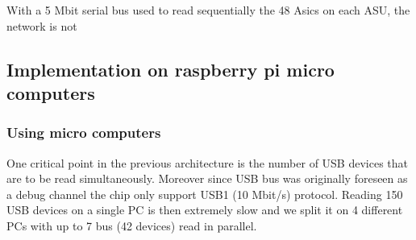 \documentclass[english]{article}
\begin{document}
With a 5 Mbit serial bus used to read sequentially the 48 Asics on each ASU, the network is not  

\subsection{Implementation on raspberry pi micro computers}
\subsubsection{Using micro computers}
One critical point in the previous architecture is the number of USB devices that are to be read simultaneously. Moreover since USB bus was originally foreseen as a debug channel the chip only support USB1 (10 Mbit/s) protocol. Reading  150 USB devices on a single PC is then extremely slow and we split it on 4 different PCs with up to 7 bus (42 devices) read in parallel.    
\end{document}
